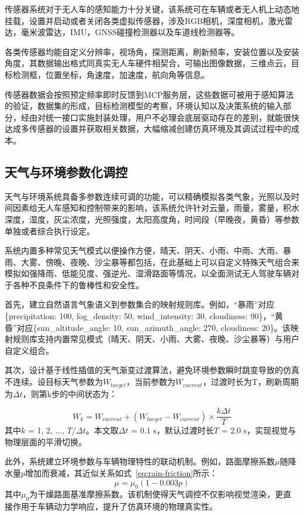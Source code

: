 传感器系统对于无人车的感知能力十分关键，该系统可在车辆或者无人机上动态地挂载，设置并启动或者关闭各类虚拟传感器，涉及RGB相机，深度相机，激光雷达，毫米波雷达，IMU，GNSS碰撞检测器以及车道线检测器等。

各类传感器均能自定义分辨率，视场角，探测距离，刷新频率，安装位置以及安装角度，其数据输出格式同真实无人车硬件相契合，可输出图像数据，三维点云，目标检测框，位置坐标，角速度，加速度，航向角等信息。

传感器数据会按照预定频率即时反馈到MCP服务层，这些数据可被用于感知算法的验证，数据集的形成，目标检测模型的考察，环境认知以及决策系统的输入部分，经由对统一接口实施封装处理，用户不必理会底层驱动存在的差别，就能很快达成多传感器的设置并获取相关数据，大幅缩减创建仿真环境及其调试过程中的成本。

\subsection{天气与环境参数化调控}

天气与环境系统具备多参数连续可调的功能，可以精确模拟各类气象，光照以及时间因素给无人车感知和控制带来的影响，该系统允许针对云量，雨量，雾量，积水深度，湿度，灰尘浓度，光照强度，太阳高度角，时间段（早晚夜，黄昏）等参数单独或者综合执行设定。

系统内置多种常见天气模式以便操作方便，晴天、阴天、小雨、中雨、大雨、暴雨、大雾、傍晚、夜晚、沙尘暴等都包括，在此基础上可以自定义特殊天气组合来模拟如强降雨、低能见度、强逆光、湿滑路面等情况，以全面测试无人驾驶车辆对于各种不良条件下的鲁棒性和安全性。

首先，建立自然语言气象语义到参数集合的映射规则库。例如，``暴雨''对应\{precipitation:
100, fog\_density: 50, wind\_intensity: 30, cloudiness:
90\}，``黄昏''对应\{sun\_altitude\_angle: 10, sun\_azimuth\_angle: 270,
cloudiness:
20\}。该映射规则库支持内置常见模式（晴天、阴天、小雨、大雾、夜晚、沙尘暴等）与用户自定义组合。

其次，设计基于线性插值的天气渐变过渡算法，避免环境参数瞬时跳变导致的仿真不连续。设目标天气参数为$W_{target}$，当前参数为$W_{current}$，过渡时长为T，刷新周期为$\Delta t$，则第k步的中间状态为：

\begin{equation}
W_k=W_{current}+(W_{target}-W_{current})\times\frac{k\Delta t}{T}
\label{eq:weather-transition}
\end{equation}
其中$k$ = 1, 2, ..., $T$/$\Delta t$。本文取$\Delta t$ = 0.1 s，默认过渡时长$T$ = 2.0
s，实现视觉与物理层面的平滑切换。

此外，系统建立环境参数与车辆物理特性的联动机制。例如，路面摩擦系数$\mu$随降水量$p$增加而衰减，其近似关系如式~\eqref{eq:rain-friction}所示：
\begin{equation}
\mu=\mu_0(1-0.003p)
\label{eq:rain-friction}
\end{equation}
其中$\mu_0$为干燥路面基准摩擦系数。该机制使得天气调控不仅影响视觉渲染，更直接作用于车辆动力学响应，提升了仿真环境的物理真实性。

